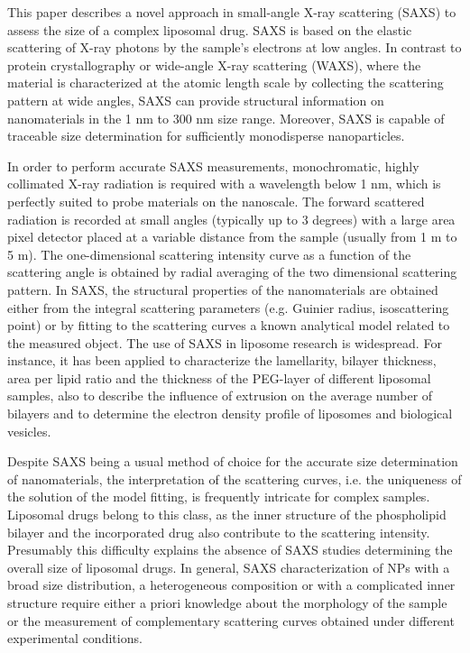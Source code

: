 This paper describes a novel approach in small-angle X-ray scattering (SAXS) to assess the size of a complex liposomal drug. SAXS is based on the elastic scattering of X-ray photons by the sample’s electrons at low angles. In contrast to protein crystallography or wide-angle X-ray scattering (WAXS), where the material is characterized at the atomic length scale by collecting the scattering pattern at wide angles, SAXS can provide structural information on nanomaterials in the 1 nm to 300 nm size range. Moreover, SAXS is capable of traceable size determination for sufficiently monodisperse nanoparticles.

In order to perform accurate SAXS measurements, monochromatic, highly collimated X-ray radiation is required with a wavelength below 1 nm, which is perfectly suited to probe materials on the nanoscale. The forward scattered radiation is recorded at small angles (typically up to 3 degrees) with a large area pixel detector placed at a variable distance from the sample (usually from 1 m to 5 m). The one-dimensional scattering intensity curve as a function of the scattering angle is obtained by radial averaging of the two dimensional scattering pattern. In SAXS, the structural properties of the nanomaterials are obtained either from the integral scattering parameters (e.g. Guinier radius, isoscattering point) or by fitting to the scattering curves a known analytical model related to the measured object.
The use of SAXS in liposome research is widespread. For instance, it has been applied to characterize the lamellarity, bilayer thickness, area per lipid ratio and the thickness of the PEG-layer of different liposomal samples, also to describe the influence of extrusion on the average number of bilayers and to determine the electron density profile of liposomes and biological vesicles.

Despite SAXS being a usual method of choice for the accurate size determination of nanomaterials, the interpretation of the scattering curves, i.e. the uniqueness of the solution of the model fitting, is frequently intricate for complex samples. Liposomal drugs belong to this class, as the inner structure of the phospholipid bilayer and the incorporated drug also contribute to the scattering intensity. Presumably this difficulty explains the absence of SAXS studies determining the overall size of liposomal drugs. In general, SAXS characterization of NPs with a broad size distribution, a heterogeneous composition or with a complicated inner structure require either a priori knowledge about the morphology of the sample or the measurement of complementary scattering curves obtained under different experimental conditions. 

